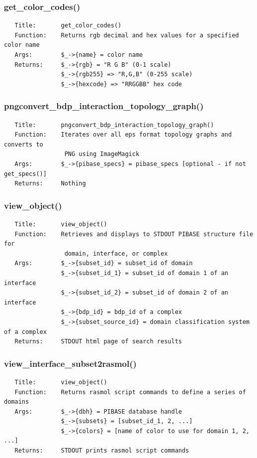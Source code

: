 \documentclass{article}
\begin{document}
\subsubsection*{get\_color\_codes()\label{pibase::web_get_color_codes_}}
\begin{verbatim}
   Title:       get_color_codes()
   Function:    Returns rgb decimal and hex values for a specified color name
   Args:        $_->{name} = color name
   Returns:     $_->{rgb} = "R G B" (0-1 scale)
                $_->{rgb255} => "R,G,B" (0-255 scale)
                $_->{hexcode} => "RRGGBB" hex code
\end{verbatim}
\subsubsection*{pngconvert\_bdp\_interaction\_topology\_graph()\label{pibase::web_pngconvert_bdp_interaction_topology_graph_}}
\begin{verbatim}
   Title:       pngconvert_bdp_interaction_topology_graph()
   Function:    Iterates over all eps format topology graphs and converts to
                 PNG using ImageMagick
   Args:        $_->{pibase_specs} = pibase_specs [optional - if not get_specs()]
   Returns:     Nothing
\end{verbatim}
\subsubsection*{view\_object()\label{pibase::web_view_object_}}
\begin{verbatim}
   Title:       view_object()
   Function:    Retrieves and displays to STDOUT PIBASE structure file for
                 domain, interface, or complex
   Args:        $_->{subset_id} = subset_id of domain
                $_->{subset_id_1} = subset_id of domain 1 of an interface
                $_->{subset_id_2} = subset_id of domain 2 of an interface
                $_->{bdp_id} = bdp_id of a complex
                $_->{subset_source_id} = domain classification system of a complex
   Returns:     STDOUT html page of search results
\end{verbatim}
\subsubsection*{view\_interface\_subset2rasmol()\label{pibase::web_view_interface_subset2rasmol_}}
\begin{verbatim}
   Title:       view_object()
   Function:    Returns rasmol script commands to define a series of domains
   Args:        $_->{dbh} = PIBASE database handle
                $_->{subsets} = [subset_id_1, 2, ...]
                $_->{colors} = [name of color to use for domain 1, 2, ...]
   Returns:     STDOUT prints rasmol script commands
\end{verbatim}
\clearpage
\end{document}
